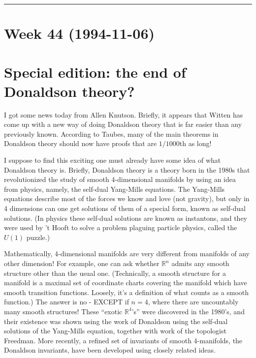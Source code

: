 \documentclass{article}
\begin{document}
\begin{center}\rule{0.5\linewidth}{0.5pt}\end{center}
\hypertarget{week-44-1994-11-06}{%
\section{Week 44 (1994-11-06)}\label{week-44-1994-11-06}}

\hypertarget{special-edition-the-end-of-donaldson-theory}{%
\section{Special edition: the end of Donaldson
theory?}\label{special-edition-the-end-of-donaldson-theory}}

I got some news today from Allen Knutson. Briefly, it appears that
Witten has come up with a new way of doing Donaldson theory that is far
easier than any previously known. According to Taubes, many of the main
theorems in Donaldson theory should now have proofs that are
\(1/1000\)th as long!

I suppose to find this exciting one must already have some idea of what
Donaldson theory is. Briefly, Donaldson theory is a theory born in the
1980s that revolutionized the study of smooth 4-dimensional manifolds by
using an idea from physics, namely, the self-dual Yang-Mills equations.
The Yang-Mills equations describe most of the forces we know and love
(not gravity), but only in 4 dimensions can one get solutions of them of
a special form, known as self-dual solutions. (In physics these
self-dual solutions are known as instantons, and they were used by 't
Hooft to solve a problem plaguing particle physics, called the \(U(1)\)
puzzle.)

Mathematically, 4-dimensional manifolds are very different from
manifolds of any other dimension! For example, one can ask whether
\(\mathbb{R}^n\) admits any smooth structure other than the usual one.
(Technically, a smooth structure for a manifold is a maximal set of
coordinate charts covering the manifold which have smooth transition
functions. Loosely, it's a definition of what counts as a smooth
function.) The answer is no - EXCEPT if \(n = 4\), where there are
uncountably many smooth structures! These ``exotic \(\mathbb{R}^4\)'s''
were discovered in the 1980's, and their existence was shown using the
work of Donaldson using the self-dual solutions of the Yang-Mills
equation, together with work of the topologist Freedman. More recently,
a refined set of invariants of smooth 4-manifolds, the Donaldson
invariants, have been developed using closely related ideas.
\end{document}
